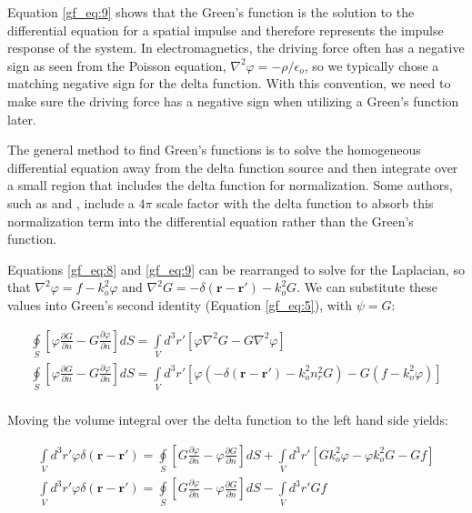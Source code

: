 Equation \ref{gf_eq:9} shows that the Green's function is the solution to the differential equation for a spatial impulse and therefore represents the impulse response of the system. In electromagnetics, the driving force often has a negative sign as seen from the Poisson equation, $\nabla^2\varphi = -\rho/\epsilon_o$, so we typically chose a matching negative sign for the delta function. With this convention, we need to make sure the driving force has a negative sign when utilizing a Green's function later.

The general method to find Green's functions is to solve the homogeneous differential equation away from the delta function source and then integrate over a small region that includes the delta function for normalization. Some authors, such as \cite{jackson_classical_em} and \cite{schwinger_em}, include a $4\pi$ scale factor with the delta function to absorb this normalization term into the differential equation rather than the Green's function.

Equations \ref{gf_eq:8} and \ref{gf_eq:9} can be rearranged to solve for the Laplacian, so that $\nabla^2\varphi = f - k_o^2\varphi$ and $\nabla^2G = -\delta\left(\mathbf{r}-\mathbf{r}' \right) - k_o^2G$. We can substitute these values into Green's second identity (Equation \ref{gf_eq:5}), with $\psi=G$:

\begin{equation}
\begin{gathered}
\oint\limits_{S} \left[ \varphi\frac{\partial G}{\partial n} - G\frac{\partial \varphi}{\partial n} \right]dS = \int\limits_{V}d^3r' \left[ \varphi\nabla^2G- G \nabla^2 \varphi\right] \\
\oint\limits_{S} \left[ \varphi\frac{\partial G}{\partial n} - G\frac{\partial \varphi}{\partial n} \right]dS = \int\limits_{V}d^3r' \left[ \varphi \left(-\delta\left(\mathbf{r}-\mathbf{r}' \right) - k_o^2n_r^2G\right)- G \left(f - k_o^2\varphi \right)\right] \\
\end{gathered}
\label{gf_eq:10}
\end{equation}
\renewcommand{\baselinestretch}{2} \small\normalsize

Moving the volume integral over the delta function to the left hand side yields:

\begin{equation}
\begin{gathered}
\int\limits_{V}d^3r'\varphi\delta\left(\mathbf{r}-\mathbf{r}' \right) = \oint\limits_{S}\left[G\frac{\partial \varphi}{\partial n} - \varphi\frac{\partial G}{\partial n} \right]dS +\int\limits_{V}d^3r'\left[ Gk_o^2\varphi - \varphi k_o^2G - Gf \right] \\
\int\limits_{V}d^3r'\varphi\delta\left(\mathbf{r}-\mathbf{r}' \right) = \oint\limits_{S}\left[G\frac{\partial \varphi}{\partial n} - \varphi\frac{\partial G}{\partial n} \right]dS -\int\limits_{V}d^3r' Gf
\end{gathered}
\label{gf_eq:10a}
\end{equation}
\renewcommand{\baselinestretch}{2} \small\normalsize

